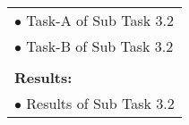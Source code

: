\begin{table}[!h]
\begin{center}
\begin{tabular}{|p{}||p{}|p{}||p{}|}
            \multicolumn{4}{|p{.95\columnwidth}|}{$\bullet$ Task-A of Sub Task 3.2}\\
            \multicolumn{4}{|p{.95\columnwidth}|}{$\bullet$ Task-B of Sub Task 3.2}\\
            \multicolumn{4}{|p{.95\columnwidth}|}{}\\
            \multicolumn{4}{|p{.95\columnwidth}|}{\textbf{Results:}}\\
            \multicolumn{4}{|p{.95\columnwidth}|}{$\bullet$ Results of Sub Task 3.2}\\
            \hline
        \end{tabular}
    \end{center}
\end{table}

\clearpage


